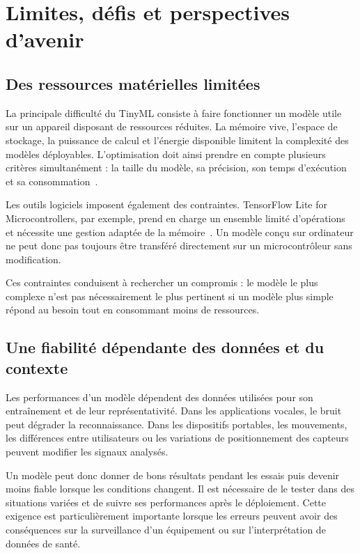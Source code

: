 \chapter{Limites, défis et perspectives d'avenir}
\label{ch:limites}

\section{Des ressources matérielles limitées}

La principale difficulté du TinyML consiste à faire fonctionner un modèle utile
sur un appareil disposant de ressources réduites. La mémoire vive, l'espace de
stockage, la puissance de calcul et l'énergie disponible limitent la complexité
des modèles déployables. L'optimisation doit ainsi prendre en compte plusieurs
critères simultanément : la taille du modèle, sa précision, son temps
d'exécution et sa consommation~\cite{banbury2020benchmarking}.

Les outils logiciels imposent également des contraintes. TensorFlow Lite for
Microcontrollers, par exemple, prend en charge un ensemble limité d'opérations
et nécessite une gestion adaptée de la mémoire~\cite{david2021tflm}. Un modèle
conçu sur ordinateur ne peut donc pas toujours être transféré directement sur un
microcontrôleur sans modification.

Ces contraintes conduisent à rechercher un compromis : le modèle le plus
complexe n'est pas nécessairement le plus pertinent si un modèle plus simple
répond au besoin tout en consommant moins de ressources.

\section{Une fiabilité dépendante des données et du contexte}

Les performances d'un modèle dépendent des données utilisées pour son
entraînement et de leur représentativité. Dans les applications vocales, le
bruit peut dégrader la reconnaissance. Dans les dispositifs portables, les
mouvements, les différences entre utilisateurs ou les variations de
positionnement des capteurs peuvent modifier les signaux analysés.

Un modèle peut donc donner de bons résultats pendant les essais puis devenir
moins fiable lorsque les conditions changent. Il est nécessaire de le tester
dans des situations variées et de suivre ses performances après le
déploiement. Cette exigence est particulièrement importante lorsque les erreurs
peuvent avoir des conséquences sur la surveillance d'un équipement ou sur
l'interprétation de données de santé.

